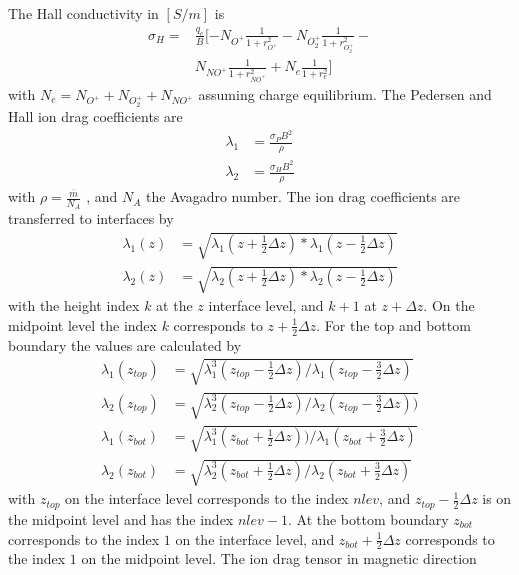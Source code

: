 %
The Hall conductivity in $[S/m]$ is
%
\begin{equation}
  \begin{split}
   \sigma_H = &\frac{q_e}{B} [ -N_{O^+} \frac{1}
      {1+r_{O^+}^2 } -
       N_{O_2^+} \frac{1}
      {1+r_{O_2^+}^2 } - \\
      & N_{NO^+} \frac{1}
      {1+r_{NO^+}^2 }+
       N_{e} \frac{1}
      {1+r_{e}^2 }  ]
  \end{split}
\end{equation}
%
with $N_e = N_{O^+} + N_{O_2^+} + N_{NO^+}$ assuming charge
equilibrium. The Pedersen and Hall ion drag coefficients are
%
\begin{align}
  \lambda_1 &= \frac{\sigma_P B^2}{\rho} \\
  \lambda_2 &= \frac{\sigma_H B^2}{\rho}
\end{align}
%
with $\rho= \frac{\overline{m}}{N_A}$ , and $N_A$ the Avagadro
number. The ion drag coefficients are transferred to interfaces by
%
\begin{align}
  \lambda_1(z) &= \sqrt{\lambda_1(z+\frac{1}{2} \Delta z)*\lambda_1(z-\frac{1}{2} \Delta z)} \\
  \lambda_2(z) &= \sqrt{\lambda_2(z+\frac{1}{2} \Delta z)*\lambda_2(z-\frac{1}{2} \Delta z)}
\end{align}
%
with the height index $k$ at the $z$ interface level, and $k+1$ at
$z + \Delta z$. On the midpoint level the index $k$ corresponds to
$z+\frac{1}{2} \Delta z$. For the top and bottom boundary the values
are calculated by
%
\begin{align}
  \lambda_1(z_{top}) &= \sqrt{\lambda_1^3(z_{top}-\frac{1}{2}\Delta z)/ \lambda_1(z_{top}-\frac{3}{2}\Delta z)} \\
  \lambda_2(z_{top}) &= \sqrt{\lambda_2^3(z_{top}-\frac{1}{2}\Delta z)/ \lambda_2(z_{top}-\frac{3}{2}\Delta z))} \\
  \lambda_1(z_{bot}) &= \sqrt{\lambda_1^3(z_{bot}+\frac{1}{2}\Delta z))/ \lambda_1(z_{bot}+\frac{3}{2}\Delta z)} \\
  \lambda_2(z_{bot}) &= \sqrt{\lambda_2^3(z_{bot}+\frac{1}{2}\Delta z)/ \lambda_2(z_{bot}+\frac{3}{2}\Delta z)}
\end{align}
%
with $z_{top}$ on the interface level corresponds to the index
$nlev$, and $z_{top}-\frac{1}{2}\Delta z$ is on the midpoint level
and has the index $nlev -1$. At the bottom boundary $z_{bot}$
corresponds to the index $1$ on the interface level, and
$z_{bot}+\frac{1}{2}\Delta z$ corresponds to the index $1$ on the
midpoint level. The ion drag tensor in magnetic direction
